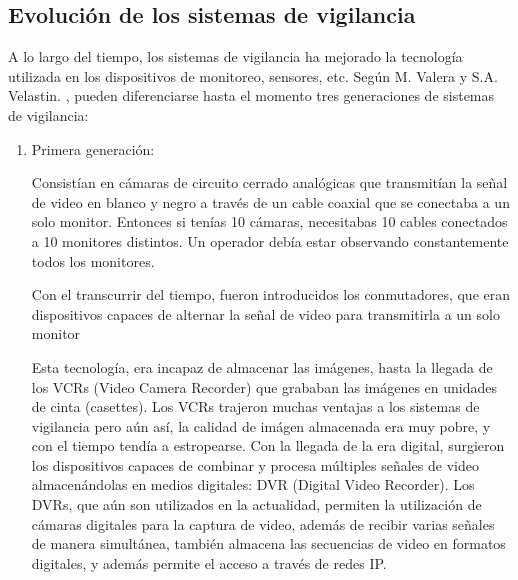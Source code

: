 \documentclass[a4paper,12pt,oneside,spanish]{book}
\begin{document}
\subsection{Evolución de los sistemas de vigilancia}
A lo largo del tiempo, los sistemas de vigilancia ha mejorado la tecnología utilizada en los dispositivos de monitoreo, sensores, etc. Según M. Valera y S.A. Velastin. \cite{valera}, pueden diferenciarse hasta el momento tres generaciones de sistemas de vigilancia:
\begin{enumerate}
	\baselineskip 16pt
	\item Primera generación: \par 
	Consistían en cámaras de circuito cerrado analógicas que transmitían la señal de video en blanco y negro a través de un cable coaxial que se conectaba a un solo monitor. Entonces si tenías 10 cámaras, necesitabas 10 cables conectados a 10 monitores distintos. Un operador debía estar observando constantemente todos los monitores. \par 
	Con el transcurrir del tiempo, fueron introducidos los conmutadores, que eran dispositivos capaces de alternar la señal de video para transmitirla a un solo monitor \par  
	Esta tecnología, era incapaz de almacenar las imágenes, hasta la llegada de los VCRs (Video Camera Recorder) que grababan las imágenes en unidades de cinta (casettes). Los VCRs trajeron muchas ventajas a los sistemas de vigilancia pero aún así, la calidad de imágen almacenada era muy pobre, y con el tiempo tendía a estropearse. Con la llegada de la era digital, surgieron los dispositivos capaces de combinar y procesa múltiples señales de video almacenándolas en medios digitales: DVR (Digital Video Recorder). Los DVRs, que aún son utilizados en la actualidad, permiten la utilización de cámaras digitales para la captura de video, además de recibir varias señales de manera simultánea, también almacena las secuencias de video en formatos digitales, y además permite el acceso a través de redes IP.\\	
	

\end{enumerate}
\end{document}
